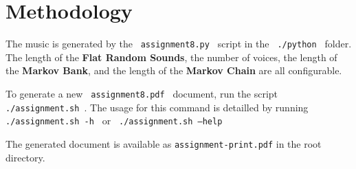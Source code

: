 \documentclass[12pt,letterpaper]{article}
\newcommand{\code}[1]{\colorbox{light-gray}{\texttt{#1}}}
\begin{document}
\begin{quote}
{%
\parindent 0pt
\noindent
\ifx\preLilyPondExample \undefined
\else
  \expandafter\preLilyPondExample
\fi
\def\lilypondbook{}%
%
\ifx\postLilyPondExample \undefined
\else
  \expandafter\postLilyPondExample
\fi
}
\end{quote}

\section{Methodology}
The music is generated by the \code{ assignment8.py } script in the 
\code{ ./python } folder. The length of the \textbf{Flat Random Sounds}, 
the number of voices, the length of the \textbf{Markov Bank}, and the 
length of the \textbf{Markov Chain} are all configurable. 

To generate a new \code{ assignment8.pdf } document, run the script 
\code{ ./assignment.sh  }. The usage for this command is detailled 
by running \code{ ./assignment.sh -h  } or \code { ./assignment.sh --help  }

The generated document is available as \code{assignment-print.pdf} in the 
root directory.
\end{document}
